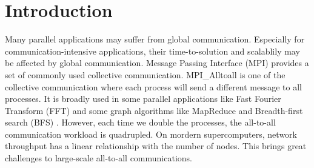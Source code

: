 \section{Introduction}




Many parallel applications may suffer from global communication.
Especially for communication-intensive applications, their time-to-solution and scalablily may be affected by global communication. 
Message Passing Interface (MPI) provides a set of commonly used collective communication.
MPI\_Alltoall is one of the collective communication where each process will send a different message to all processes.
It is broadly used in some parallel applications like Fast Fourier Transform (FFT) \cite{mehta2021parallel} and some graph algorithms like MapReduce \cite{plimpton2011mapreduce} and Breadth-first search (BFS) \cite{ueno2012highly}.
However, each time we double the processes, the all-to-all communication workload is quadrupled.
On mordern supercomputers, network throughput has a linear relationship with the number of nodes.
This brings great challenges to large-scale all-to-all communications.

